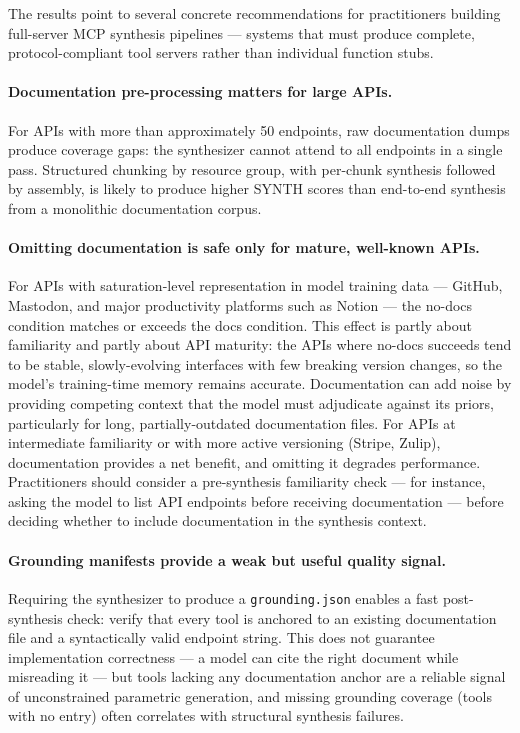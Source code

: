 The results point to several concrete recommendations for practitioners building full-server MCP synthesis pipelines --- systems that must produce complete, protocol-compliant tool servers rather than individual function stubs.

\paragraph{Documentation pre-processing matters for large APIs.}
For APIs with more than approximately 50 endpoints, raw documentation dumps produce coverage gaps: the synthesizer cannot attend to all endpoints in a single pass. Structured chunking by resource group, with per-chunk synthesis followed by assembly, is likely to produce higher SYNTH scores than end-to-end synthesis from a monolithic documentation corpus.

\paragraph{Omitting documentation is safe only for mature, well-known APIs.} For APIs with saturation-level representation in model training data --- GitHub, Mastodon, and major productivity platforms such as Notion --- the no-docs condition matches or exceeds the docs condition. This effect is partly about familiarity and partly about API maturity: the APIs where no-docs succeeds tend to be stable, slowly-evolving interfaces with few breaking version changes, so the model's training-time memory remains accurate. Documentation can add noise by providing competing context that the model must adjudicate against its priors, particularly for long, partially-outdated documentation files. For APIs at intermediate familiarity or with more active versioning (Stripe, Zulip), documentation provides a net benefit, and omitting it degrades performance. Practitioners should consider a pre-synthesis familiarity check --- for instance, asking the model to list API endpoints before receiving documentation --- before deciding whether to include documentation in the synthesis context.

\paragraph{Grounding manifests provide a weak but useful quality signal.} Requiring the synthesizer to produce a \texttt{grounding.json} enables a fast post-synthesis check: verify that every tool is anchored to an existing documentation file and a syntactically valid endpoint string. This does not guarantee implementation correctness --- a model can cite the right document while misreading it --- but tools lacking any documentation anchor are a reliable signal of unconstrained parametric generation, and missing grounding coverage (tools with no entry) often correlates with structural synthesis failures.

